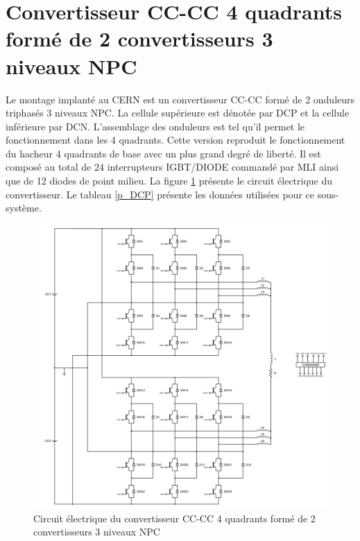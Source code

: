\section{Convertisseur CC-CC 4 quadrants formé de 2 convertisseurs 3 niveaux NPC}
Le montage implanté au CERN est un convertisseur CC-CC formé de 2 onduleurs triphasés 3 niveaux NPC. La cellule supérieure est dénotée par DCP et la cellule inférieure par DCN. L'assemblage des onduleurs est tel qu'il permet le fonctionnement dans les 4 quadrants. Cette version reproduit le fonctionnement du hacheur 4 quadrants de base avec un plus grand degré de liberté. Il est composé au total de 24 interrupteurs IGBT/DIODE commandé par MLI ainsi que de 12 diodes de point milieu. La figure \ref{circuit_DCP_DCN} présente le circuit électrique du convertisseur. Le tableau \ref{p_DCP} présente les données utilisées pour ce sous-système.


\begin{figure}[htb]
\centering
\includegraphics[scale=0.75]{fig/DCP_DCN.png}
\caption{Circuit électrique du convertisseur CC-CC 4 quadrants formé de 2 convertisseurs 3 niveaux NPC}
\label{circuit_DCP_DCN}
\end{figure}


